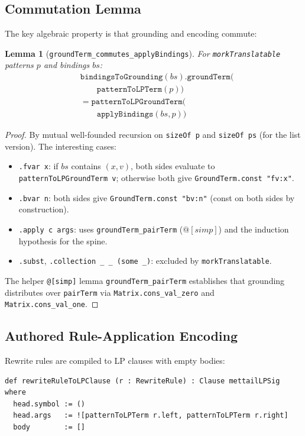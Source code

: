 \documentclass[]{article}
\newtheorem{lemma}[theorem]{Lemma}
\newcommand{\code}[1]{\texttt{#1}}
\begin{document}
\subsection{Commutation Lemma}

The key algebraic property is that grounding and encoding commute:

\begin{lemma}[\code{groundTerm\_commutes\_applyBindings}]
\label{lem:commute}
For \code{morkTranslatable} patterns $p$ and bindings $bs$:
\[
  \begin{aligned}
  &\code{bindingsToGrounding}(bs).\code{groundTerm}( \\
  &\qquad \code{patternToLPTerm}(p)) \\
  &= \code{patternToLPGroundTerm}( \\
  &\qquad \code{applyBindings}(bs, p))
  \end{aligned}
\]
\end{lemma}

\begin{proof}
By mutual well-founded recursion on \code{sizeOf p} and \code{sizeOf ps}
(for the list version).  The interesting cases:
\begin{itemize}
\item \code{.fvar x}: if $bs$ contains $(x, v)$, both sides evaluate to
  \code{patternToLPGroundTerm v}; otherwise both give \code{GroundTerm.const "fv:x"}.
\item \code{.bvar n}: both sides give \code{GroundTerm.const "bv:n"} (const on both
  sides by construction).
\item \code{.apply c args}: uses \code{groundTerm\_pairTerm} ($@[simp]$) and the
  induction hypothesis for the spine.
\item \code{.subst}, \code{.collection \_ \_ (some \_)}: excluded by
  \code{morkTranslatable}.
\end{itemize}
The helper \code{@[simp]} lemma \code{groundTerm\_pairTerm} establishes
that grounding distributes over \code{pairTerm} via \code{Matrix.cons\_val\_zero}
and \code{Matrix.cons\_val\_one}.
\end{proof}

\subsection{Authored Rule-Application Encoding}

Rewrite rules are compiled to LP clauses with empty bodies:

\begin{lstlisting}[language=lean]
def rewriteRuleToLPClause (r : RewriteRule) : Clause mettailLPSig where
  head.symbol := ()
  head.args   := ![patternToLPTerm r.left, patternToLPTerm r.right]
  body        := []
\end{lstlisting}
\end{document}
